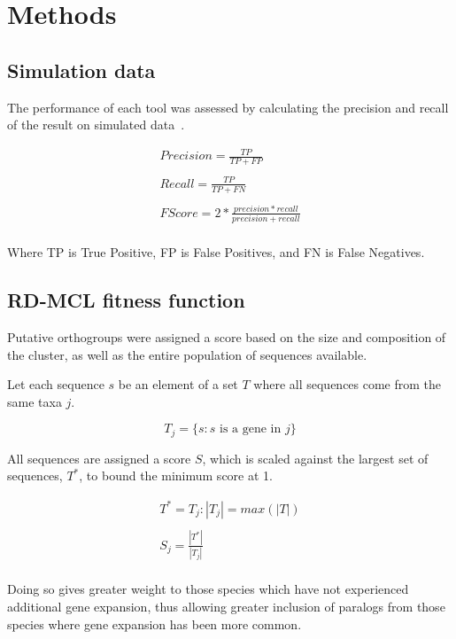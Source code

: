 \documentclass[twocolumn]{bmcart}%
\begin{document}
\section{Methods}\label{sec:methods}
\subsection{Simulation data}\label{subsec:simulationData}
The performance of each tool was assessed by calculating the precision and recall of the result on simulated data~\cite{Emms:2015ig}.

\begin{gather*}
    Precision = \frac{TP}{TP + FP}\\
    \\
    Recall = \frac{TP}{TP + FN}\\
    \\
    F Score = 2 * \frac{precision * recall}{precision + recall}\\
\end{gather*}

Where TP is True Positive, FP is False Positives, and FN is False Negatives.

\subsection{RD-MCL fitness function}\label{subsec:rd-mclFitnessFunction}
Putative orthogroups were assigned a score based on the size and composition of the cluster, as well as the entire population of sequences available.

Let each sequence $s$ be an element of a set $T$ where all sequences come from the same taxa $j$.

\[
T_j = \{s:s \text{ is a gene in } j\}
\]

All sequences are assigned a score $S$, which is scaled against the largest set of sequences, $T^*$, to bound the minimum score at 1.

\begin{gather*}
    T^* = T_j:|T_j| = max(|T|)\\
    \\
    S_j = \frac{|T^*|}{|T_j|}\\
\end{gather*}

Doing so gives greater weight to those species which have not experienced additional gene expansion, thus allowing greater inclusion of paralogs from those species where gene expansion has been more common.
\end{document}
